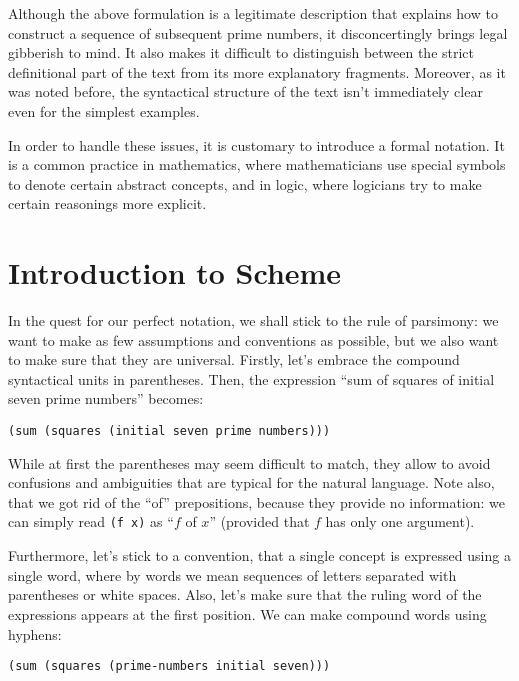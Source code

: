 Although the above formulation is a legitimate description
that explains how to construct a sequence of subsequent
prime numbers, it disconcertingly brings legal gibberish
to mind. It also makes it difficult to distinguish between
the strict definitional part of the text from its more
explanatory fragments. Moreover, as it was noted before,
the syntactical structure of the text isn't immediately
clear even for the simplest examples.

In order to handle these issues, it is customary to
introduce a formal notation. It is a common practice
in mathematics, where mathematicians use special symbols
to denote certain abstract concepts, and in logic, where
logicians try to make certain reasonings more explicit.

\section{Introduction to Scheme}

In the quest for our perfect notation, we shall stick
to the rule of parsimony: we want to make as few assumptions
and conventions as possible, but we also want to make sure
that they are universal. Firstly, let's embrace the
compound syntactical units in parentheses. Then, the
expression ``sum of squares of initial seven prime numbers''
becomes:

\texttt{(sum (squares (initial seven prime numbers)))}

While at first the parentheses may seem difficult
to match, they allow to avoid confusions and ambiguities
that are typical for the natural language. Note also,
that we got rid of the ``of'' prepositions, because
they provide no information: we can simply read \texttt{(f x)}
as ``$f$ of $x$'' (provided that $f$ has only one argument).

Furthermore, let's stick to a convention, that a single
concept is expressed using a single word, where by words
we mean sequences of letters separated with parentheses
or white spaces. Also, let's make sure that the ruling
word of the expressions appears at the first position.
We can make compound words using hyphens:

\texttt{(sum (squares (prime-numbers initial seven)))}

